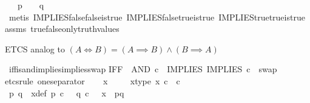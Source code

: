 \begin{isabellebody}
\ \ \ {\isachardoublequoteopen}p\ {\isacharequal}{\kern0pt}\ {\isasymt}\ {\isasymand}\ q\ {\isacharequal}{\kern0pt}\ {\isasymf}{\isachardoublequoteclose}\isanewline
%
\isadelimproof
\ \ %
\endisadelimproof
%
\isatagproof
{}\isamarkupfalse%
\ {\isacharparenleft}{\kern0pt}metis\ IMPLIES{\isacharunderscore}{\kern0pt}false{\isacharunderscore}{\kern0pt}false{\isacharunderscore}{\kern0pt}is{\isacharunderscore}{\kern0pt}true\ IMPLIES{\isacharunderscore}{\kern0pt}false{\isacharunderscore}{\kern0pt}true{\isacharunderscore}{\kern0pt}is{\isacharunderscore}{\kern0pt}true\ IMPLIES{\isacharunderscore}{\kern0pt}true{\isacharunderscore}{\kern0pt}true{\isacharunderscore}{\kern0pt}is{\isacharunderscore}{\kern0pt}true\ assms\ true{\isacharunderscore}{\kern0pt}false{\isacharunderscore}{\kern0pt}only{\isacharunderscore}{\kern0pt}truth{\isacharunderscore}{\kern0pt}values{\isacharparenright}{\kern0pt}%
\endisatagproof
{\isafoldproof}%
%
\isadelimproof
%
\endisadelimproof
%
\begin{isamarkuptext}%
ETCS analog to $(A \iff B) = (A \implies B) \land (B \implies A)$%
\end{isamarkuptext}\isamarkuptrue%
\isamarkupfalse%
\ iff{\isacharunderscore}{\kern0pt}is{\isacharunderscore}{\kern0pt}and{\isacharunderscore}{\kern0pt}implies{\isacharunderscore}{\kern0pt}implies{\isacharunderscore}{\kern0pt}swap{\isacharcolon}{\kern0pt}\isanewline
{\isachardoublequoteopen}IFF\ {\isacharequal}{\kern0pt}\ AND\ {\isasymcirc}\isactrlsub c\ \ {\isasymlangle}IMPLIES{\isacharcomma}{\kern0pt}\ IMPLIES\ {\isasymcirc}\isactrlsub c\ \ swap\ {\isasymOmega}\ {\isasymOmega}{\isasymrangle}{\isachardoublequoteclose}\isanewline
%
\isadelimproof
%
\endisadelimproof
%
\isatagproof
{}\isamarkupfalse%
{\isacharparenleft}{\kern0pt}etcs{\isacharunderscore}{\kern0pt}rule\ one{\isacharunderscore}{\kern0pt}separator{\isacharparenright}{\kern0pt}\isanewline
\ \ \isamarkupfalse%
\ x\ \isanewline
\ \ \isamarkupfalse%
\ x{\isacharunderscore}{\kern0pt}type{\isacharcolon}{\kern0pt}\ {\isachardoublequoteopen}x\ {\isasymin}\isactrlsub c\ {\isasymOmega}\ {\isasymtimes}\isactrlsub c\ {\isasymOmega}{\isachardoublequoteclose}\isanewline
\ \ \isamarkupfalse%
\ \isamarkupfalse%
\ p\ q\ \ x{\isacharunderscore}{\kern0pt}def{\isacharcolon}{\kern0pt}\ {\isachardoublequoteopen}p\ {\isasymin}\isactrlsub c\ {\isasymOmega}\ {\isasymand}\ q\ {\isasymin}\isactrlsub c\ {\isasymOmega}\ {\isasymand}\ x\ {\isacharequal}{\kern0pt}\ {\isasymlangle}p{\isacharcomma}{\kern0pt}q{\isasymrangle}{\isachardoublequoteclose}\isanewline

\end{isabellebody}
